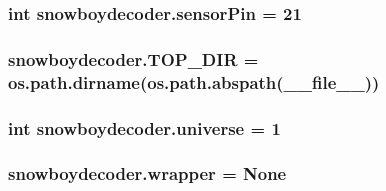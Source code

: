 \subsubsection[{\texorpdfstring{sensor\+Pin}{sensorPin}}]{\setlength{\rightskip}{0pt plus 5cm}int snowboydecoder.\+sensor\+Pin = 21}\hypertarget{namespacesnowboydecoder_abd726466a87ba7ed09c2d381bd05517f}{}\label{namespacesnowboydecoder_abd726466a87ba7ed09c2d381bd05517f}
\subsubsection[{\texorpdfstring{T\+O\+P\+\_\+\+D\+IR}{TOP_DIR}}]{\setlength{\rightskip}{0pt plus 5cm}snowboydecoder.\+T\+O\+P\+\_\+\+D\+IR = os.\+path.\+dirname(os.\+path.\+abspath(\+\_\+\+\_\+file\+\_\+\+\_\+))}\hypertarget{namespacesnowboydecoder_a1e552ae6ff3e3ebc614f0a9256394cce}{}\label{namespacesnowboydecoder_a1e552ae6ff3e3ebc614f0a9256394cce}
\subsubsection[{\texorpdfstring{universe}{universe}}]{\setlength{\rightskip}{0pt plus 5cm}int snowboydecoder.\+universe = 1}\hypertarget{namespacesnowboydecoder_a37a026a2ba8e25398941669f91c05d35}{}\label{namespacesnowboydecoder_a37a026a2ba8e25398941669f91c05d35}
\subsubsection[{\texorpdfstring{wrapper}{wrapper}}]{\setlength{\rightskip}{0pt plus 5cm}snowboydecoder.\+wrapper = None}\hypertarget{namespacesnowboydecoder_abd498a60cff1cc4bc6fcca373c2b492f}{}\label{namespacesnowboydecoder_abd498a60cff1cc4bc6fcca373c2b492f}
